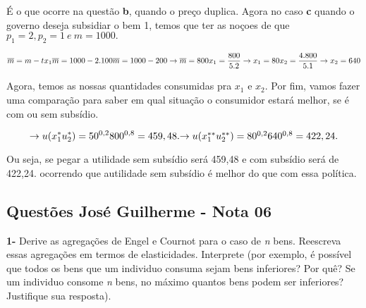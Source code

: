 \begin{flushleft}
\begin{center}
	É o que ocorre na questão \textbf{b}, quando o preço duplica. Agora no caso \textbf{c} quando o governo deseja subsidiar o bem 1, temos que ter as noçoes de que $p_{1} = 2, p_{2} = 1 \ e \ m = 1000.$
\end{center}

\begin{equation}
	\overline{m} = m - tx_{1}
	$$\\$$
	\overline{m} = 1000 - 2.100
	$$\\$$
	\overline{m} = 1000 - 200 \rightarrow \overline{m} = 800
	$$\\$$
	x_{1} = \dfrac{800}{5.2} \rightarrow x_{1} = 80
	$$\\$$
	x_{2} = \dfrac{4.800}{5.1} \rightarrow x_{2} = 640
\end{equation}
 \begin{center}
	 Agora, temos as nossas quantidades consumidas pra $x_{1}$ e $x_{2}$. Por fim, vamos fazer uma comparação para saber em qual situação o consumidor estará melhor, se é com ou sem subsídio.
 \end{center}
 \begin{equation}
	\rightarrow u(x_{1}^{*}u_{2}^{*}) = 50^{0,2}800^{0,8} = 459,48.
	$$\\$$
	\rightarrow u(x_{1}^{**}u_{2}^{**}) = 80^{0,2}640^{0,8} = 422,24.
 \end{equation}

 \begin{center}
	 Ou seja, se pegar a utilidade sem subsídio será 459,48 e com subsídio será de 422,24. ocorrendo que autilidade sem subsídio é melhor do que com essa política.
 \end{center}
\singlespacing

\begin{center}
	\section*{Questões José Guilherme - Nota 06}
\end{center}

\singlespacing

\textbf{1-} Derive as agregações de Engel e Cournot para o caso de \textit{n} bens. Reescreva essas agregações em termos de elasticidades. Interprete (por exemplo, é possível que todos os bens que um individuo consuma sejam bens inferiores? Por quê? Se um individuo consome \textit{n} bens, no máximo quantos bens podem ser inferiores? Justifique sua resposta).


\end{flushleft}
